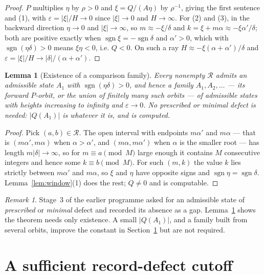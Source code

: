 \documentclass[11pt]{article}
\newtheorem{lemma}[theorem]{Lemma}
\theoremstyle{definition}
\theoremstyle{remark}
\newtheorem{remark}[theorem]{Remark}
\newcommand{\dd}{\delta}
\newcommand{\sgn}{\operatorname{sgn}}
\begin{document}
\begin{proof}
$P$ multiplies $\eta$ by $\rho>0$ and $\xi=Q/(A\eta)$ by $\rho^{-1}$, giving the first
sentence and (1), with $\varepsilon=|\xi|/H\to0$ since $|\xi|\to0$ and $H\to\infty$. For (2)
and (3), in the backward direction $\eta\to0$ and $|\xi|\to\infty$, so
$m\approx-\xi/\dd$ and $k=\xi+m\alpha\approx-\xi\alpha'/\dd$; both are positive exactly when
$\sgn\xi=-\sgn\dd$ and $\alpha'>0$, which with $\sgn(\eta\dd)>0$ means $\xi\eta<0$, i.e.
$Q<0$. On such a ray $H\approx-\xi(\alpha+\alpha')/\dd$ and $\varepsilon=|\xi|/H\to
|\dd|/(\alpha+\alpha')$.
\end{proof}

\begin{lemma}[Existence of a comparison family]\label{lem:fam}
Every nonempty $\mathcal R$ admits an admissible state $A_1$ with $\sgn(\eta\dd)>0$, and hence a
family $A_1,A_2,\dots$ --- its forward $P$-orbit, or the union of finitely many such orbits ---
of admissible states with heights increasing to infinity and $\varepsilon\to0$. No prescribed
or minimal defect is needed: $|Q(A_1)|$ is whatever it is, and is computed.
\end{lemma}

\begin{proof}
Pick $(a,b)\in\mathcal R$. The open interval with endpoints $m\alpha'$ and $m\alpha$ --- that is
$(m\alpha',m\alpha)$ when $\alpha>\alpha'$, and $(m\alpha,m\alpha')$ when $\alpha$ is the
smaller root --- has length $m|\dd|\to\infty$, so for $m\equiv a\pmod M$ large enough it
contains $M$ consecutive integers and hence some $k\equiv b\pmod M$. For such $(m,k)$ the value
$k$ lies strictly between $m\alpha'$ and $m\alpha$, so $\xi$ and $\eta$ have opposite signs and
$\sgn\eta=\sgn\dd$. Lemma~\ref{lem:window}(1) does the rest; $Q\ne0$ and is computable.
\end{proof}

\begin{remark}
Stage~3 of the earlier programme asked for an admissible state of \emph{prescribed} or
\emph{minimal} defect and recorded its absence as a gap. Lemma~\ref{lem:fam} shows the theorem
needs only existence. A small $|Q(A_1)|$, and a family built from several orbits, improve the
constant in Section~\ref{sec:cutoff} but are not required.
\end{remark}

\section{A sufficient record-defect cutoff}\label{sec:cutoff}
\end{document}
